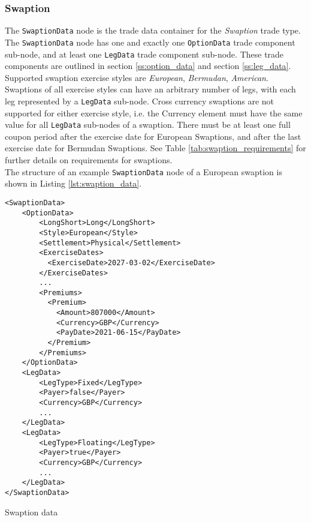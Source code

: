 \subsubsection{Swaption}
\label{ss:swaption} 

The \lstinline!SwaptionData!  node is the trade data container for the \emph{Swaption} trade type. The \lstinline!SwaptionData!
node has one and exactly one \lstinline!OptionData! trade component sub-node, and at least one \lstinline!LegData! trade
component sub-node.  These trade components are outlined in section \ref{ss:option_data} and section
\ref{ss:leg_data}.\\
\vspace{5mm}
Supported swaption exercise styles are \emph{European}, \emph{Bermudan}, \emph{American}. Swaptions of all exercise styles can have an arbitrary number of legs, with
each leg represented by a \lstinline!LegData! sub-node.  Cross currency swaptions are not supported for either exercise style, i.e. the Currency element must
have the same value for all \lstinline!LegData! sub-nodes of a swaption. There must be at least one full coupon period after the exercise date for European 
Swaptions, and after the last exercise date for Bermudan Swaptions. See Table \ref{tab:swaption_requirements} for further details on requirements for
 swaptions.\\
\vspace{5mm}
The structure of an example \lstinline!SwaptionData!  node of a European swaption is shown in Listing
\ref{lst:swaption_data}.

\begin{listing}[H]
\begin{verbatim}
<SwaptionData>
    <OptionData>
        <LongShort>Long</LongShort>
        <Style>European</Style>
        <Settlement>Physical</Settlement>
        <ExerciseDates>
          <ExerciseDate>2027-03-02</ExerciseDate>
        </ExerciseDates>
        ...
        <Premiums>
          <Premium>
            <Amount>807000</Amount>
            <Currency>GBP</Currency>
            <PayDate>2021-06-15</PayDate>
          </Premium>
        </Premiums>
    </OptionData>
    <LegData>
        <LegType>Fixed</LegType>
        <Payer>false</Payer>    
        <Currency>GBP</Currency>
        ...
    </LegData>
    <LegData>
        <LegType>Floating</LegType>
        <Payer>true</Payer>     
        <Currency>GBP</Currency>
        ...
    </LegData>
</SwaptionData>
\end{verbatim}
\caption{Swaption data}
\label{lst:swaption_data}
\end{listing}

